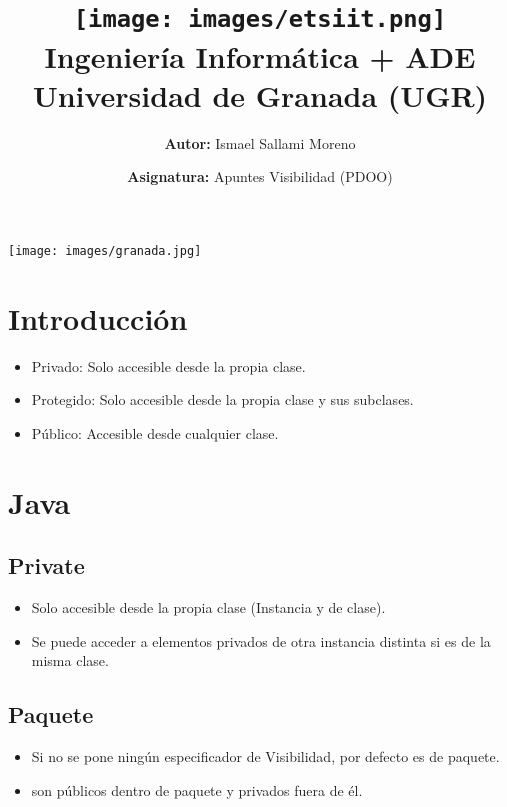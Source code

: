 \documentclass[a4paper,12pt]{article}
\title{
    \vspace{-2cm}
    \texttt{[image: images/etsiit.png]} \\ %
    \LARGE Ingeniería Informática + ADE\\
    \large Universidad de Granada (UGR)\\[1cm]
}
\author{\textbf{Autor:} Ismael Sallami Moreno}
\date{\textbf{Asignatura:} Apuntes Visibilidad (PDOO)\\[1cm]}
\begin{document}
\maketitle
\thispagestyle{empty}

\begin{center}
    \texttt{[image: images/granada.jpg]} \\ %
    \vfill
\end{center}

\newpage

\tableofcontents
\newpage

\section{Introducción}

\begin{itemize}
    \item Privado: Solo accesible desde la propia clase.
    \item Protegido: Solo accesible desde la propia clase y sus subclases.
    \item Público: Accesible desde cualquier clase.
\end{itemize}

\section{Java}

\subsection{Private}

\begin{itemize}
    \item Solo accesible desde la propia clase (Instancia y de clase).
    \item Se puede acceder a elementos privados de otra instancia distinta si es de la misma clase.
\end{itemize}

\subsection{Paquete}

\begin{itemize}
    \item Si no se pone ningún especificador de Visibilidad, por defecto es de paquete.
    \item son públicos dentro de paquete y privados fuera de él.
\end{itemize}
\end{document}
